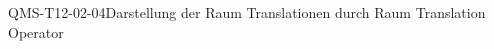 
\begin{DEF}{QMS-T12-02-04}{Darstellung der Raum Translationen durch Raum Translation Operator}
\end{DEF}
